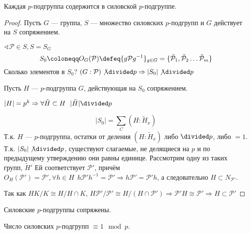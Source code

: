 \begin{theorem}
    \label{силов1}
    Каждая \(p\)-подгруппа содержится в силовской \(p\)-подгруппе.
\end{theorem}
\begin{proof}
    Пусть \(G\) --- группа, \(S\) --- множество силовских \(p\)-подгрупп и \(G\) действует на \(S\) сопряжением.

    \(\sphericalangle \mathcal{P} \in S, S = S_G\)
    \[S_0 \coloneqq O_G(\mathcal{P}) \defeq \{g\mathcal{P}g^{-1}\}_{g \in G} = \{ \tilde{\mathcal{P}}_1, \tilde{\mathcal{P}}_2 \dots \tilde{\mathcal{P}}_m\}\]
    Сколько элементов в \(S_0\)? \((G : \mathcal{P}) \not\divided p \Rightarrow |S_0| \not\divided p\)

    Пусть \(H\) --- \(p\)-подгруппа \(G\), действующая на \(S_0\) сопряжением.

    \begin{remark}
        \(|H| = p^k \Rightarrow \forall \tilde{H} \subset H \ \ |\tilde{H}| \divided p\)
    \end{remark}
    \[|S_0| = \sum_{C} (H : \tilde{H}_x)\]
    Т.к. \(H\) --- \(p\)-подгруппа, остатки от деления \((H : \tilde{H}_x)\) либо \(\divided p\), либо \(= 1\). Т.к. \(|S_0| \not\divided p\), существуют слагаемые, не делящиеся на \(p\) и по предыдущему утверждению они равны единице. Рассмотрим одну из таких групп, \(\tilde{H}'\) Ей соответствует \(\mathcal{P}'\), причём \(O_{H}(\mathcal{P}') = \mathcal{P}', \forall h \in H \ \ h\mathcal{P}'h^{-1} = \mathcal{P}' \Rightarrow h\mathcal{P}' = \mathcal{P}'h\), а следовательно \(H \subset N_{\mathcal{P}'}\).

    Так как \(HK / K \cong H / H \cap K\), \(H\mathcal{P}' / \mathcal{P}' \cong H / (H \cap \mathcal{P}') \Rightarrow \mathcal{P}'H \cong \mathcal{P}' \Rightarrow H \subset \mathcal{P}'\)
\end{proof}

\begin{theorem}
    \label{силов2}
    Силовские \(p\)-подгруппы сопряжены.
\end{theorem}

\begin{theorem}
    \label{силов3}
    Число силовских \(p\)-подгрупп \(\equiv 1 \mod p\).
\end{theorem}

\unfinished
